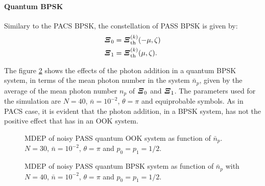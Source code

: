     \paragraph{Quantum BPSK}
        Similary to the PACS BPSK, the constellation of PASS BPSK is given by:
        \begin{subequations}
            \begin{align}
                \Operator{\varXi}_0 &= \Operator{\varXi}_{\mathrm{th}}^{(k)}(-\mu,\zeta)\\
                \Operator{\varXi}_1 &= \Operator{\varXi}_{\mathrm{th}}^{(k)}(\mu,\zeta).
            \end{align}
        \end{subequations}
        
        The figure \ref{fig:3.7} shows the effects of the photon addition in a quantum BPSK
        system, in terms of the mean photon number in the system $\bar{n}_p$, given by the average of 
        the mean photon number $n_p$ of $\Operator{\varXi}_0$ and $\Operator{\varXi}_1$. The parameters used
        for the simulation are $N=40$, $\bar{n}=10^{-2}$, $\theta=\pi$ and equiprobable symbols.
        As in PACS case, it is evident that the photon addition, in a BPSK system, has not
        the positive effect that has in an OOK system.
        
        \begin{figure}[t]
            \begin{center}
                
                \caption{MDEP of noisy PASS quantum OOK system as function of $\bar{n}_p$.\\
                $N=30$, $\bar{n}=10^{-2}$, $\theta=\pi$ and $p_0=p_1=1/2$.}
                \label{fig:3.6}
            \end{center}
        \end{figure}
        \begin{figure}[t]
            \begin{center}
                
                \caption{MDEP of noisy PASS quantum BPSK system as function of $\bar{n}_p$ with
                $N=40$, $\bar{n}=10^{-2}$, $\theta=\pi$ and $p_0=p_1=1/2$.}
                \label{fig:3.7}
            \end{center}
        \end{figure}